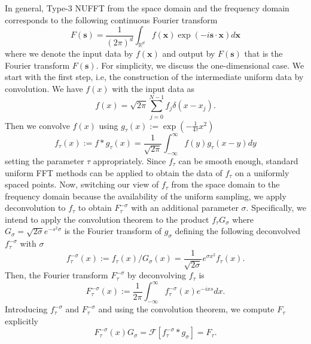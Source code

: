 In general, Type-$3$ NUFFT from the space domain and the frequency domain corresponds to the following continuous Fourier transform
\begin{equation}
    F(\bm{s}) 
  = \frac{1}{(2\pi)^d} \int_{\mathbb{R}^d}^{}
    f(\bm{x})\exp(-i\bm{s}\cdot\bm{x}) d\bm{x}
\end{equation}
where we denote the input data by $f(\bm{x})$ and output by $F(\bm{s})$ that is the Fourier transform $F(\bm{s})$.
For simplicity, we discuss the one-dimensional case.
We start with the first step, i.e, the construction of the intermediate uniform data by convolution.
We have $f(x)$ with the input data as 
\begin{equation}
  f(x) = \sqrt{2\pi}\sum_{j=0}^{N-1}f_j\delta(x-x_j).
\end{equation}
Then we convolve $f(x)$ using $g_{\tau}(x) := \exp(-\frac{1}{4\tau}x^2)$
\begin{equation}
    f_{\tau}(x) := f\ast g_{\tau} (x) 
  = \frac{1}{\sqrt{2\pi}} \int_{-\infty}^{\infty} f(y)g_{\tau}(x-y) dy
\end{equation}
setting the parameter $\tau$ appropriately.
Since $f_{\tau}$ can be smooth enough, standard uniform FFT methods can be applied to obtain the data of $f_{\tau}$ on a uniformly spaced points.
Now, switching our view of $f_{\tau}$ from the space domain to the frequency domain because the availability of the uniform sampling, we apply deconvolution to $f_{\tau}$ to obtain $F_{\tau}^{-\sigma}$ with an additional parameter $\sigma$.
Specifically, we intend to apply the convolution theorem to the product $f_{\tau}G_{\sigma}$ 
where $G_{\sigma} = \sqrt{2\sigma}e^{-s^2\sigma}$ is the Fourier transform of $g_{\sigma}$ defining the following deconvolved $f_{\tau}^{-\sigma}$ with $\sigma$
\begin{equation}
    f_{\tau}^{-\sigma}(x) := f_{\tau}(x)/G_{\sigma}(x) 
  = \frac{1}{\sqrt{2\sigma}}e^{\sigma x^2}f_{\tau}(x).
\end{equation}
Then, the Fourier transform $F_{\tau}^{-\sigma}$ by deconvolving $f_{\tau}$ is
\begin{equation}
     F_{\tau}^{-\sigma}(x) 
  := \frac{1}{2\pi} \int_{-\infty}^{\infty} f_{\tau}^{-\sigma}(x) e^{-ixs} dx.
\end{equation}
Introducing $f_{\tau}^{-\sigma}$ and $F_{\tau}^{-\sigma}$ and using the convolution theorem,
we compute $F_{\tau}$ explicitly
\begin{equation}
     F_{\tau}^{-\sigma}(x)G_{\sigma} 
   = \mathcal{F}[f_{\tau}^{-\sigma}\ast g_{\sigma}]
   = F_{\tau}.
\end{equation}
